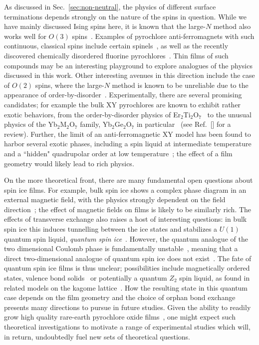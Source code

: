 \documentclass[aps,prx,reprint,runinaddress,superscriptaddress,amsmath,amssymb,floatfix,longbibliography]{revtex4-1}
\newcommand{\abo}[2]{{#1}$_2${#2}$_2$O$_7$}
\begin{document}
As discussed in Sec.~\ref{sec:non-neutral}, the physics of different surface terminations depends strongly on the nature of the spins in question. While we have mainly discussed Ising spins here, it is known that the large-$N$ method also works well for $O(3)$ spins~\cite{Isakov2004,Conlon2010}. Examples of pyrochlore anti-ferromagnets with such continuous, classical spins include certain spinels~\cite{Lee2010}, as well as the recently discovered chemically disordered fluorine pyrochlores~\cite{krizan1,krizan2}. Thin films of such compounds may be an interesting playground to explore analogues of the physics discussed in this work. Other interesting avenues in this direction include the case of $O(2)$ spins, where the large-$N$ method is known to be unreliable due to the appearance of order-by-disorder~\cite{bramwell1994order,Moessner1998a,Moessner1998}. Experimentally, there are several promising candidates; for example the bulk XY pyrochlores are known to exhibit rather exotic behaviors, from the order-by-disorder physics of \abo{Er}{Ti}~\cite{Champion,Zhito,Savary} to the unusual physics of the \abo{Yb}{M} family, \abo{Yb}{Ge} in particular~\cite{Dun2014,Dun2015,Hallas} (see Ref.~[] for a review). Further, the limit of an anti-ferromagnetic XY model has been found to harbor several exotic phases, including a spin liquid at intermediate temperature and a ``hidden" quadrupolar order at low temperature~\cite{taillefumier2017frustrating}; the effect of a film geometry would likely lead to rich physics. 

On the more theoretical front, there are many fundamental open questions about spin ice films. For example, bulk spin ice shows a complex phase diagram in an external magnetic field, with the physics strongly dependent on the field direction~\cite{moessner2003,Jaubert2008,Ruff2005}; the effect of magnetic fields on films is likely to be similarly rich. The effects of transverse exchange also raises a host of interesting questions: in bulk spin ice this induces tunnelling between the ice states and stabilizes a $U(1)$ quantum spin liquid, \emph{quantum spin ice}~\cite{Gingras2014}. However, the quantum analogue of the two dimensional Coulomb phase is fundamentally unstable~\cite{polyakov1977quark}, meaning that a direct two-dimensional analogue of quantum spin ice does not exist~\cite{Henry2014}. The fate of quantum spin ice films is thus unclear; possibilities include magnetically ordered states, valence bond solids~\cite{Henry2014} or potentially a quantum $Z_2$ spin liquid, as found in related models on the kagome lattice~\cite{carrasquilla2015two}. How the resulting state in this quantum case depends on the film geometry and the choice of orphan bond exchange presents many directions to pursue in future studies. Given the ability to readily grow high quality rare-earth pyrochlore oxide films~\cite{Leusink2014,Bovo2014}, one might expect such theoretical investigations to motivate a range of experimental studies which will, in return, undoubtedly fuel new sets of theoretical questions.
\end{document}
